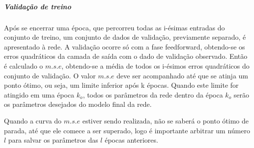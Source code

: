 \documentclass[	12pt, Times, openright, twoside, a4paper, english, brazil]{abntex2}
\begin{document}
            \begin{figure}[H]
            \end{figure}
           
            \subparagraph{Validação de treino}
            Após se encerrar uma época, que percorreu todas as i-ésimas entradas do conjunto de treino, um conjunto de dados de validação, previamente separado, é apresentado à rede.
            A validação ocorre só com a fase feedforward, obtendo-se os erros quadráticos da camada de saída com o dado de validação observado.
            Então é calculado o $m.s.e$, obtendo-se a média de todos os i-ésimos erros quadráticos do conjunto de validação.
            O valor $m.s.e$ deve ser acompanhado até que se atinja um ponto ótimo, ou seja, um limite inferior após k épocas.
            Quando este limite for atingido em uma época $k_o$, todos os parâmetros da rede dentro da época $k_o$ serão os parâmetros desejados do modelo final da rede.
            
            Quando a curva do $m.s.e$ estiver sendo realizada, não se saberá o ponto ótimo de parada, até que ele comece a ser superado, logo é importante arbitrar um número $l$ para salvar os parâmetros das $l$ épocas anteriores.
        
\end{document}
